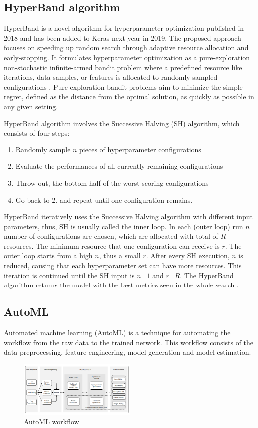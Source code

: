 \documentclass[conference]{IEEEtran}
\begin{document}
\subsection{HyperBand algorithm}
HyperBand is a novel algorithm for hyperparameter optimization published in 2018\cite{JMLR:v18:16-558} and has been added to Keras next year in 2019. The proposed approach focuses on speeding up random search through adaptive resource allocation and early-stopping. It formulates hyperparameter optimization as a pure-exploration non-stochastic infinite-armed bandit problem where a predefined resource like iterations, data samples, or features is allocated to randomly sampled configurations \cite{JMLR:v18:16-558}. Pure exploration bandit problems aim to minimize the simple regret, defined as the distance from the optimal solution, as quickly as possible in any given setting.

HyperBand algorithm involves the Successive Halving (SH) algorithm, which consists of four steps:
\begin{enumerate}
    \item Randomly sample $n$ pieces of hyperparameter conﬁgurations
    \item Evaluate the performances of all currently remaining conﬁgurations
    \item Throw out, the bottom half of the worst scoring configurations
    \item Go back to 2. and repeat until one configuration remains.
\end{enumerate}

HyperBand iteratively uses the Successive Halving algorithm with different input parameters, thus, SH is usually called the inner loop. In each (outer loop) run $n$ number of configurations are chosen, which are allocated with total of $R$ resources. The minimum resource that one configuration can receive is $r$. The outer loop starts from a high $n$, thus a small $r$. After every SH execution, $n$ is reduced, causing that each hyperparameter set can have more resources. This iteration is continued until the SH input is $n$=$1$ and $r$=$R$. The HyperBand algorithm returns the model with the best metrics seen in the whole search \cite{JMLR:v18:16-558}.



\subsection{AutoML}
Automated machine learning (AutoML) is a technique for automating the workflow from the raw data to the trained network. This workflow consists of the data preprocessing, feature engineering, model generation and model estimation.
\begin{figure}[htbp]
\centerline{\includegraphics[width=0.5\textwidth]{automl.png}}
\caption{AutoML workflow \cite{he2020automl}}
\label{automl}
\end{figure}
\end{document}
